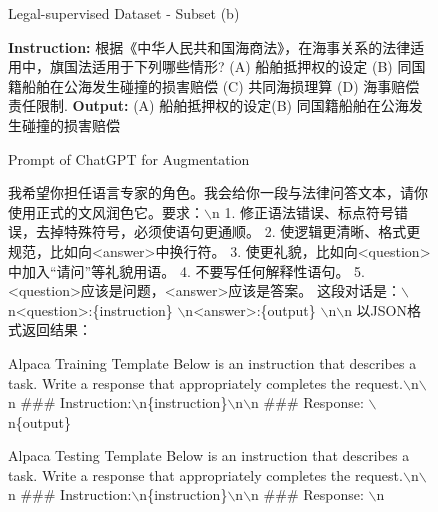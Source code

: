 \begin{figure}[t]
    \begin{definedbox}[label=ex:sft-corpus-b]{Legal-supervised Dataset - Subset (b)}
        \begin{CJK*}{UTF8}{gbsn}
        \textbf{Instruction:} 根据《中华人民共和国海商法》，在海事关系的法律适用中，旗国法适用于下列哪些情形? (A) 船舶抵押权的设定 (B) 同国籍船舶在公海发生碰撞的损害赔偿 (C) 共同海损理算 (D) 海事赔偿责任限制.
        \tcbline
        \textbf{Output:} (A) 船舶抵押权的设定(B) 同国籍船舶在公海发生碰撞的损害赔偿
        \end{CJK*}
    \end{definedbox}
    \vskip -0.1in
\end{figure}

\begin{figure}[t]
    \begin{promptbox}[label=ex:sft-corpus-c]{Prompt of ChatGPT for Augmentation}
        \begin{CJK*}{UTF8}{gbsn}
        我希望你担任语言专家的角色。我会给你一段与法律问答文本，请你使用正式的文风润色它。要求：$\backslash$n
            1. 修正语法错误、标点符号错误，去掉特殊符号，必须使语句更通顺。
            2. 使逻辑更清晰、格式更规范，比如向<answer>中换行符。
            3. 使更礼貌，比如向<question>中加入“请问”等礼貌用语。
            4. 不要写任何解释性语句。
            5. <question>应该是问题，<answer>应该是答案。
            这段对话是：$\backslash$n<question>:\{instruction\} $\backslash$n<answer>:\{output\} $\backslash$n$\backslash$n
        以JSON格式返回结果：
        \end{CJK*}
    \end{promptbox}
    \vskip -0.1in
\end{figure}

\begin{figure}[t]
    \begin{promptbox}[label=ex:alpaca]{Alpaca Training Template}
        Below is an instruction that describes a task. Write a response that appropriately completes the request.$\backslash$n$\backslash$n \#\#\# Instruction:$\backslash$n\{instruction\}$\backslash$n$\backslash$n \#\#\# Response: $\backslash$n\{output\}
    \end{promptbox}
    \vskip -0.1in
\end{figure}

\begin{figure}[t]
    \begin{promptbox}[label=ex:alpaca-test]{Alpaca Testing Template}
        Below is an instruction that describes a task. Write a response that appropriately completes the request.$\backslash$n$\backslash$n \#\#\# Instruction:$\backslash$n\{instruction\}$\backslash$n$\backslash$n \#\#\# Response: $\backslash$n
    \end{promptbox}
    \vskip -0.1in
\end{figure}

